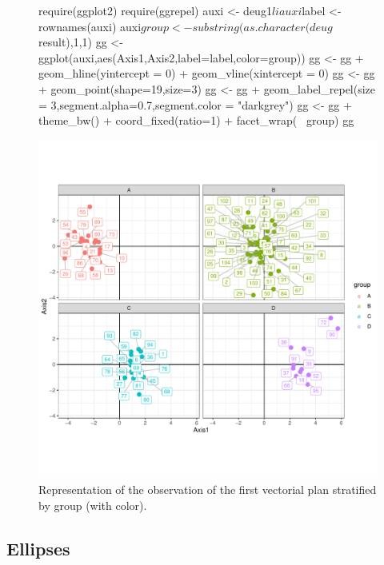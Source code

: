 \documentclass[a4paper,10pt]{article}
\begin{document}
\begin{figure}[H]
\begin{center}
\begin{Schunk}
\begin{Sinput}
  require(ggplot2)
  require(ggrepel)
  auxi <- deug1$li
  auxi$label <- rownames(auxi)
  auxi$group <- substring(as.character(deug$result),1,1)
  gg <- ggplot(auxi,aes(Axis1,Axis2,label=label,color=group))
  gg <- gg + geom_hline(yintercept = 0) + geom_vline(xintercept = 0)
  gg <- gg + geom_point(shape=19,size=3)
  gg <- gg + geom_label_repel(size = 3,segment.alpha=0.7,segment.color = "darkgrey")
  gg <-  gg + theme_bw() + coord_fixed(ratio=1) + facet_wrap(~ group)
  gg
\end{Sinput}
\end{Schunk}
\includegraphics{figs/sweave-liclass2}
\caption{Representation of the observation of the first vectorial plan stratified by group (with color).}
\label{fig:liclass2}
\end{center}
\end{figure}



\subsection{Ellipses}
\end{document}
